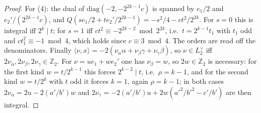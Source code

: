 \documentclass[11pt,reqno]{amsart}
\theoremstyle{plain}
\theoremstyle{definition}
\newcommand{\Z}{\mathbb{Z}}
\begin{document}
\begin{proof}
For (4): the dual of $\mathrm{diag}(-2,-2^{2k-1}c)$ is spanned by $e_1/2$ and $e_2'/(2^{2k-1}c)$, and
$Q(se_1/2+te_2'/2^{2k-1})=-s^2/4-ct^2/2^{2k}$. For $s=0$ this is integral iff $2^k\mid t$; for $s=1$
iff $ct^2\equiv-2^{2k-2}\bmod2^{2k}$, i.e.\ $t=2^{k-1}t_1$ with $t_1$ odd and $ct_1^2\equiv-1\bmod4$,
which holds since $c\equiv3\bmod4$. The orders are read off the denominators. Finally
$\langle\nu,x\rangle=-2(\nu_\alpha\alpha+\nu_\beta\gamma+\nu_\gamma\beta)$, so $\nu\in L_2^\vee$ iff
$2\nu_\alpha,2\nu_\beta,2\nu_\gamma\in\Z_2$. For $\nu=ue_1+we_2'$ one has $\nu_\beta=w$, so
$2w\in\Z_2$ is necessary: for the first kind $w=t/2^{k-1}$ this forces $2^{k-2}\mid t$, i.e.\
$\rho=k-1$, and for the second kind $w=t/2^k$ with $t$ odd it forces $k=1$, again $\rho=k-1$; in both
cases $2\nu_\alpha=2u-2(a'/b')w$ and $2\nu_\gamma=-2(a'/b')u+2w(a'^2/b'^2-c'/b')$ are then integral.
\end{proof}
\end{document}
